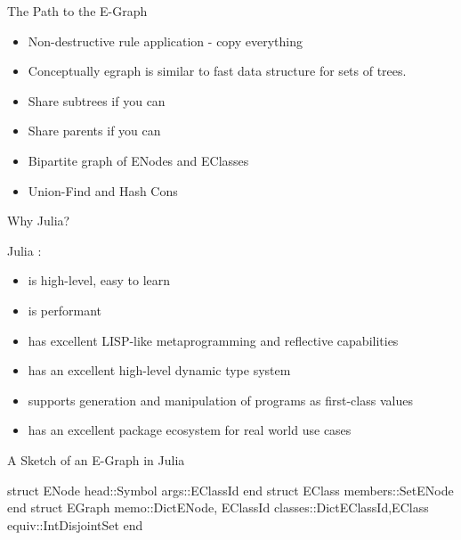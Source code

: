 \documentclass[8pt]{beamer}  %
\begin{document}
\begin{frame}{The Path to the E-Graph}
\begin{itemize}
\item Non-destructive rule application - copy everything
\item Conceptually egraph is similar to fast data structure for sets of trees.
\item Share subtrees if you can
\item Share parents if you can
\item Bipartite graph of ENodes and EClasses
\item Union-Find and Hash Cons

\end{itemize}

\end{frame}

\begin{frame}{Why Julia?}   %

Julia :

\begin{itemize}
    \item is high-level, easy to learn
    \item is performant
    \item has excellent LISP-like metaprogramming and reflective capabilities
    \item has an excellent high-level dynamic type system
    \item supports generation and manipulation of programs as first-class values
    \item has an excellent package ecosystem for real world use cases
\end{itemize}

\end{frame}






\begin{frame}[fragile]{A Sketch of an E-Graph in Julia}
\begin{jllisting}
struct ENode
    head::Symbol
    args::EClassId
end
struct EClass
    members::Set{ENode}
end
struct EGraph
    memo::Dict{ENode, EClassId}
    classes::Dict{EClassId,EClass}
    equiv::IntDisjointSet 
end
\end{jllisting}
\end{frame}
\end{document}
